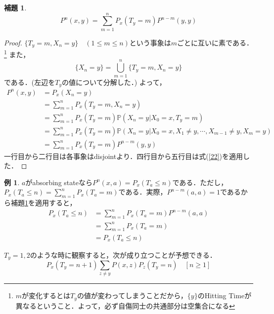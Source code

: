 \documentclass[12pt, a4paper]{jsarticle}
\theoremstyle{definition}
\newtheorem{lem}[thm]{補題}
\newtheorem{ex}{例}[section]
\begin{document}
\begin{screen}
	\begin{lem} \label{lem1-2}
	\[P^n (x,y) = \sum_{m = 1}^{n} P_x(T_y = m)P^{n-m}(y,y)\]
	\end{lem}
\end{screen}
\begin{proof}
$\{T_y = m, X_n =y\} \quad (1 \leq m \leq n)$という事象は$m$ごとに互いに素である．\footnote{$m$が変化するとは$T_y$の値が変わってしまうことだから，$\{y\}$のHitting Timeが異なるということ．よって，必ず自傷同士の共通部分は空集合になる}
また，
\[ \{X_n = y\} = \bigcup_{m=1}^{n} \{ T_y = m , X_n = y \} \]
である．(左辺を$T_y$の値について分解した．)
よって，
\begin{align*}
P^n(x,y) &= P_x(X_n = y) \\
&= \sum_{m = 1}^{n} P_x(T_y =m, X_n = y) 　\\
&= \sum_{m= 1}^{n} P_x(T_y = m) \mathbb{P}(X_n = y | X_0 = x, T_y = m) \\
&= \sum_{m= 1}^{n} P_x(T_y = m) \mathbb{P}(X_n = y | X_0 = x, X_1 \neq y, \cdots ,X_{m-1} \neq y, X_m =y) \\
&= \sum_{m= 1}^{n} P_x(T_y = m)P^{n-m}(y,y) 
\end{align*}
一行目から二行目は各事象はdisjointより．四行目から五行目は式(\ref{22})を適用した．
\end{proof}

\begin{ex}
$a$がabsorbing stateなら$P^n(x,a) = P_x(T_a \leq n)$である．ただし，$P_x(T_a \leq n) = \displaystyle \sum_{m = 1}^n P_x(T_a = m)$である．実際，$P^{n-m}(a,a) = 1$であるから補題\ref{lem1-2}を適用すると，
\begin{align*}
P_x(T_a \leq n) &= \sum_{m = 1}^n P_x(T_a = m)P^{n-m}(a,a) \\
&= \sum_{m = 1}^n P_x(T_a = m) \\
&= P_x(T_a \leq n)
\end{align*}
\end{ex}

$T_y = 1,2$のような時に観察すると，次が成り立つことが予想できる．
\begin{equation}
	P_x(T_y = n+1) \sum_{z \neq y}P(x,z)P_z(T_y = n) \quad [n \geq 1]
\end{equation}
\end{document}
